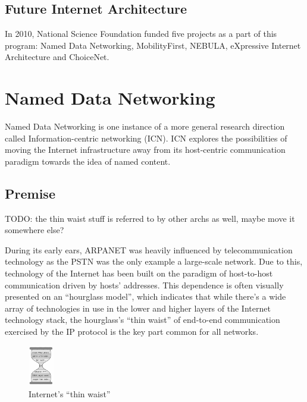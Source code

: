         \subsection{Future Internet Architecture}
            In 2010, National Science Foundation funded five projects as a part of this program: Named Data Networking, MobilityFirst, NEBULA, eXpressive Internet Architecture and ChoiceNet.


    \section{Named Data Networking}\label{archs:ndn}

        Named Data Networking is one instance of a more general research direction called Information-centric networking (ICN). ICN explores the possibilities of moving the Internet infrastructure away from its host-centric communication paradigm towards the idea of named content.

        \subsection{Premise}

            TODO: the thin waist stuff is referred to by other archs as well, maybe move it somewhere else?

            During its early ears, ARPANET was heavily influenced by telecommunication technology as the PSTN was the only example a large-scale network. Due to this, technology of the Internet has been built on the paradigm of host-to-host communication driven by hosts' addresses. This dependence is often visually presented on an ``hourglass model'', which indicates that while there's a wide array of technologies in use in the lower and higher layers of the Internet technology stack, the hourglass's ``thin waist'' of end-to-end communication exercised by the IP protocol is the key part common for all networks.

            \begin{figure}[H]
                \begin{center}
                    \includegraphics[width=0.1\textwidth]{fig/archs_inet-hourglass.jpg}
                  \caption{Internet's ``thin waist''}
                  \label{fig:internet_waist}
                \end{center}
            \end{figure}

